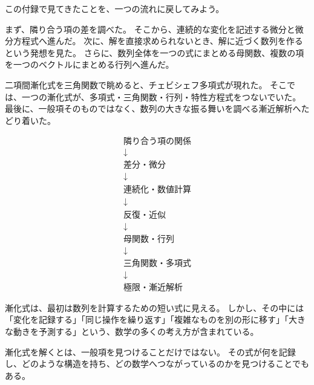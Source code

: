 この付録で見てきたことを、一つの流れに戻してみよう。

まず、隣り合う項の差を調べた。
そこから、連続的な変化を記述する微分と微分方程式へ進んだ。
次に、解を直接求められないとき、解に近づく数列を作るという発想を見た。
さらに、数列全体を一つの式にまとめる母関数、複数の項を一つのベクトルにまとめる行列へ進んだ。

二項間漸化式を三角関数で眺めると、チェビシェフ多項式が現れた。
そこでは、一つの漸化式が、多項式・三角関数・行列・特性方程式をつないでいた。
最後に、一般項そのものではなく、数列の大きな振る舞いを調べる漸近解析へたどり着いた。

\[
\begin{array}{c}
\text{隣り合う項の関係}\\
\downarrow\\
\text{差分・微分}\\
\downarrow\\
\text{連続化・数値計算}\\
\downarrow\\
\text{反復・近似}\\
\downarrow\\
\text{母関数・行列}\\
\downarrow\\
\text{三角関数・多項式}\\
\downarrow\\
\text{極限・漸近解析}
\end{array}
\]

漸化式は、最初は数列を計算するための短い式に見える。
しかし、その中には「変化を記録する」「同じ操作を繰り返す」「複雑なものを別の形に移す」「大きな動きを予測する」という、数学の多くの考え方が含まれている。

漸化式を解くとは、一般項を見つけることだけではない。
その式が何を記録し、どのような構造を持ち、どの数学へつながっているのかを見つけることでもある。
